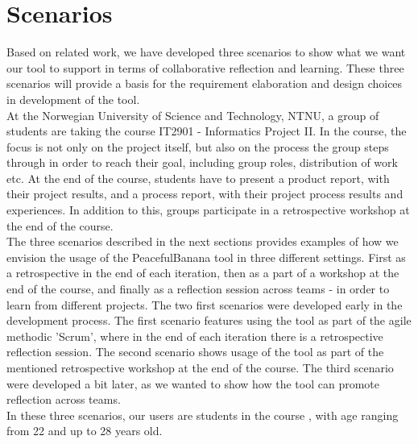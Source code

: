 \section{Scenarios}
\label{problemdefinition}
Based on related work, we have developed three scenarios to show what we want our tool to support in terms of collaborative reflection and learning. These three scenarios will provide a basis for the requirement elaboration and design choices in development of the tool. 
\\
At the Norwegian University of Science and Technology, NTNU, a group of students are taking the course IT2901 - Informatics Project II\footnotemark.
In the course, the focus is not only on the project itself, but also on the process the group steps through in order to reach their goal, including group roles, distribution of work etc. At the end of the course, students have to present a product report, with their project results, and a process report, with their project process results and experiences. In addition to this, groups participate in a retrospective workshop at the end of the course.
\\
The three scenarios described in the next sections provides examples of how we envision the usage of the PeacefulBanana tool in three different settings. First as a retrospective in the end of each iteration, then as a part of a workshop at the end of the course, and finally as a reflection session across teams - in order to learn from different projects. 
The two first scenarios were developed early in the development process. The first scenario features using the tool as part of the agile methodic 'Scrum', where in the end of each iteration there is a retrospective reflection session. The second scenario shows usage of the tool as part of the mentioned retrospective workshop at the end of the course. The third scenario were developed a bit later, as we wanted to show how the tool can promote reflection across teams. 
\\

In these three scenarios, our users are students in the course , with age ranging from 22 and up to 28 years old. 

